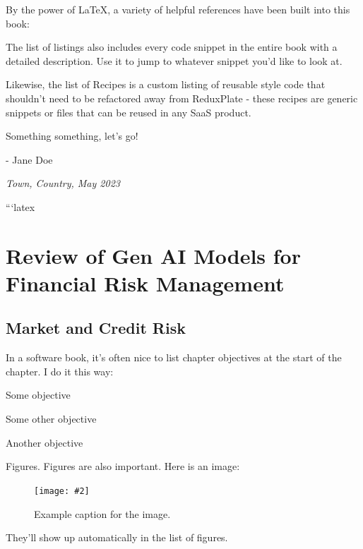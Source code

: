 \documentclass[a4paper,headinclude=on,footinclude=on,12pt,oneside]{scrbook}
\newcommand{\standardfigure}[3]{\begin{figure}[H]\begin{center}\texttt{[image: \#2]}\caption{#3}\label{fig:#2}\end{center}\end{figure}}
\begin{document}

By the power of LaTeX, a variety of helpful references have been built into this book:



The list of listings also includes every code snippet in the entire book with a detailed description. Use it to jump to whatever snippet you'd like to look at.

Likewise, the list of Recipes is a custom listing of reusable style code that shouldn't need to be refactored away from ReduxPlate - these recipes are generic snippets or files that can be reused in any SaaS product.


Something something, let's go!

- Jane Doe

\textit{Town, Country, May 2023}


```latex

\chapter{Review of Gen AI Models for Financial Risk Management}



\section{Market and Credit Risk}

In a software book, it's often nice to list chapter objectives at the start of the chapter. I do it this way:

\begin{arrows}
	\item Some objective
	\item Some other objective
	\item Another objective
\end{arrows}



Figures. Figures are also important. Here is an image:

\standardfigure{\textwidth/2}{folder-one/example}{Example caption for the image.}

They'll show up automatically in the list of figures.
\end{document}
